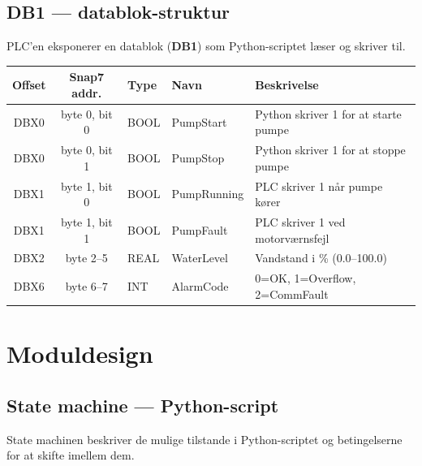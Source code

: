 \documentclass[12pt, a4paper]{article}
\begin{document}
\subsection{DB1 --- datablok-struktur}\label{sec:db1}

PLC'en eksponerer en datablok (\textbf{DB1}) som Python-scriptet læser og skriver til.

\begin{center}
\begin{tabular}{cclll}
\toprule
\textbf{Offset} & \textbf{Snap7 addr.} & \textbf{Type} & \textbf{Navn} & \textbf{Beskrivelse} \\
\midrule
DBX0   & byte 0, bit 0 & BOOL & PumpStart     & Python skriver 1 for at starte pumpe \\
DBX0   & byte 0, bit 1 & BOOL & PumpStop      & Python skriver 1 for at stoppe pumpe \\
DBX1   & byte 1, bit 0 & BOOL & PumpRunning   & PLC skriver 1 når pumpe kører \\
DBX1   & byte 1, bit 1 & BOOL & PumpFault     & PLC skriver 1 ved motorværnsfejl \\
DBX2   & byte 2--5     & REAL & WaterLevel    & Vandstand i \% (0.0--100.0) \\
DBX6   & byte 6--7     & INT  & AlarmCode     & 0=OK, 1=Overflow, 2=CommFault \\
\bottomrule
\end{tabular}
\end{center}

\section{Moduldesign}

\subsection{State machine --- Python-script}

State machinen beskriver de mulige tilstande i Python-scriptet og betingelserne
for at skifte imellem dem.
\end{document}

